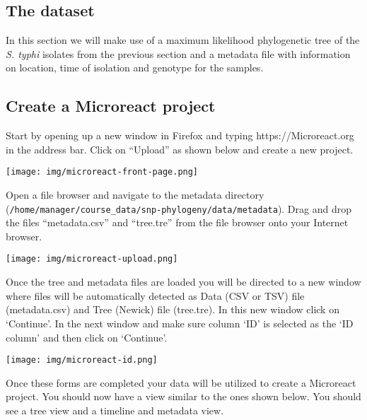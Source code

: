 \documentclass[11pt]{article}
\begin{document}
    \hypertarget{the-dataset}{%
\subsection{The dataset}\label{the-dataset}}

In this section we will make use of a maximum likelihood phylogenetic
tree of the \textit{S. typhi} isolates from the previous section and a
metadata file with information on location, time of isolation and
genotype for the samples.

    \hypertarget{create-a-microreact-project}{%
\subsection{Create a Microreact
project}\label{create-a-microreact-project}}

Start by opening up a new window in Firefox and typing
https://Microreact.org in the address bar. Click on ``Upload'' as shown
below and create a new project.


\begin{center}
\texttt{[image: img/microreact-front-page.png]}
\end{center}


Open a file browser and navigate to the metadata directory
(\texttt{/home/manager/course\_data/snp-phylogeny/data/metadata}). Drag
and drop the files ``metadata.csv'' and ``tree.tre'' from the file
browser onto your Internet browser.


\begin{center}
\texttt{[image: img/microreact-upload.png]}
\end{center}


Once the tree and metadata files are loaded you will be directed to a
new window where files will be automatically detected as Data (CSV or
TSV) file (metadata.csv) and Tree (Newick) file (tree.tre). In this new
window click on `Continue'. In the next window and make sure column `ID'
is selected as the `ID column' and then click on `Continue'.


\begin{center}
\texttt{[image: img/microreact-id.png]}
\end{center}


Once these forms are completed your data will be utilized to create a
Microreact project. You should now have a view similar to the ones shown
below. You should see a tree view and a timeline and metadata view.
\end{document}
